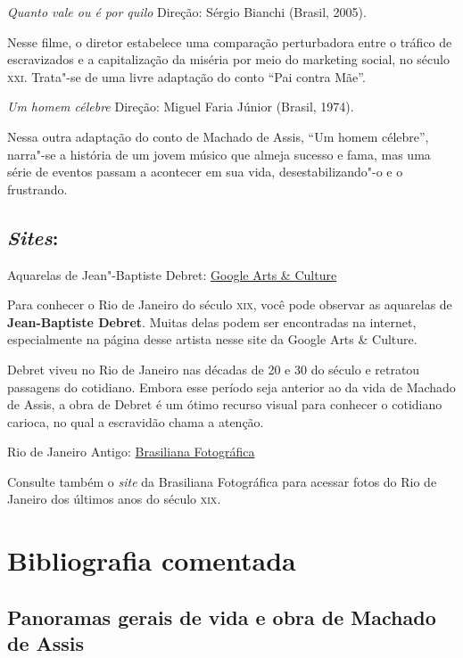 \documentclass[11pt]{extarticle}
\begin{document}
\textit{Quanto vale ou é por quilo} Direção: Sérgio Bianchi (Brasil, 2005).

Nesse filme, o diretor estabelece uma comparação perturbadora entre o
tráfico de escravizados e a capitalização da miséria por meio do
marketing social, no século \textsc{xxi}. Trata"-se de uma livre adaptação do
conto ``Pai contra Mãe''.

\textit{Um homem célebre} Direção: Miguel Faria Júnior (Brasil, 1974).

Nessa outra adaptação do conto de Machado de Assis, ``Um homem célebre'', narra"-se 
a história de um jovem músico que almeja sucesso e fama, mas uma série de eventos 
passam a acontecer em sua vida, desestabilizando"-o e o frustrando.

\subsection{\emph{Sites}:}

Aquarelas de Jean"-Baptiste Debret:
\href{https://artsandculture.google.com/entity/jean-baptiste-debret/m049vrh}{Google Arts \& Culture}

Para conhecer o Rio de Janeiro do século \textsc{xix}, você pode observar as
aquarelas de \textbf{Jean-Baptiste Debret}. Muitas delas podem ser
encontradas na internet, especialmente na página desse artista nesse site da Google Arts \& Culture.

Debret viveu no Rio de Janeiro nas décadas de 20 e 30 do século  e
retratou passagens do cotidiano. Embora esse período seja anterior ao da
vida de Machado de Assis, a obra de Debret é um ótimo recurso visual para
conhecer o cotidiano carioca, no qual a escravidão chama a atenção.

Rio de Janeiro Antigo: \href{http://brasilianafotografica.bn.br}{Brasiliana Fotográfica}

Consulte também o \emph{site} da Brasiliana Fotográfica para acessar fotos do Rio de
Janeiro dos últimos anos do século \textsc{xix}.

\section{Bibliografia comentada}

\subsection{Panoramas gerais de vida e obra de Machado de Assis}
\end{document}
